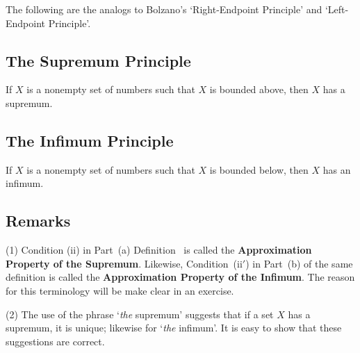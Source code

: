 \VV

        The following are the analogs to Bolzano's `Right-Endpoint Principle' and `Left-Endpoint Principle'.

\V

            \subsection{\small{\bf The Supremum Principle}}
            \label{DefB30.08C}

\V

        If $X$ is a nonempty set of numbers such that $X$ is bounded above, then $X$ has a supremum.

\VV

            \subsection{\small{\bf The Infimum Principle}}
            \label{DefB30.08F}

\V

        If $X$ is a nonempty set of numbers such that $X$ is bounded below, then $X$ has an infimum.

\VV

            \subsection{\small{\bf Remarks}}
            \label{RemrkB30.08FF}

\V

\hspace*{\parindent} (1) Condition (ii) in Part~(a) Definition~ is called the {\bf Approximation Property of the Supremum}.
     Likewise, Condition~(ii$'$) in Part~(b) of the same definition is called the
    {\bf Approximation Property of the Infimum}.
    The reason for this terminology will be make clear in an exercise.


\V

        (2) The use of the phrase `{\em the} supremum' suggests that if a set $X$ has a supremum, it is unique; likewise for `{\em the} infimum'.
    It is easy to show that these suggestions are correct.

\V

